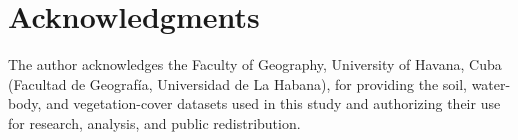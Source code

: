 \documentclass[11pt,a4paper]{article}
\begin{document}
	\section*{Acknowledgments}
	
	The author acknowledges the Faculty of Geography,
	University of Havana, Cuba (Facultad de Geografía,
	Universidad de La Habana), for providing the soil,
	water-body, and vegetation-cover datasets used in
	this study and authorizing their use for research,
	analysis, and public redistribution.
	
	
	
	
	
	
	\printbibliography
	
\end{document}
